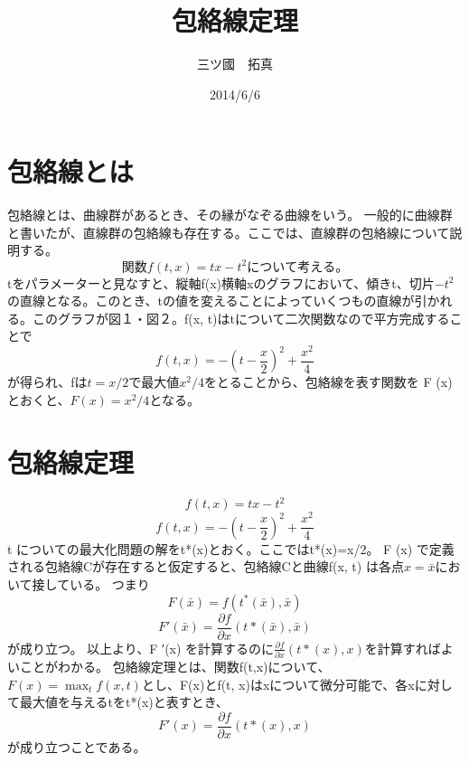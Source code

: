 \documentclass[11pt,a4j,fleqn]{jarticle}
\title{包絡線定理}
\author{三ツ國　拓真}
\date{2014/6/6}
\begin{document}
\maketitle

\section{包絡線とは}

包絡線とは、曲線群があるとき、その縁がなぞる曲線をいう。
一般的に曲線群と書いたが、直線群の包絡線も存在する。ここでは、直線群の包絡線について説明する。
　　　
\[
関数　　f(t, x) = t x - t^2　　　　　　　について考える。
\]
tをパラメーターと見なすと、縦軸f(x)横軸xのグラフにおいて、傾きt、切片$- t^2$の直線となる。このとき、tの値を変えることによっていくつもの直線が引かれる。このグラフが図１・図２。f(x, t)はtについて二次関数なので平方完成することで
\[
f(t, x) = -\left(t - \frac{x}{2}\right)^2 + \frac{x^2}{4} \label{eq:square-2}
\]
が得られ、fは$t=x/2$で最大値$x^2/4$をとることから、包絡線を表す関数を F (x) とおくと、$F (x) =x^2/4$となる。


\section{包絡線定理}

\begin{equation}
f(t, x) = t x - t^2 \label{eq:square}
\end{equation}
\begin{equation}
f(t, x) = -\left(t - \frac{x}{2}\right)^2 + \frac{x^2}{4} \label{eq:square-2}
\end{equation}
 t についての最大化問題の解をt*(x)とおく。ここではt*(x)=x/2。
F (x) で定義される包絡線Cが存在すると仮定すると、包絡線Cと曲線f(x, t) は各点$x = \bar{x}$において接している。
つまり
\begin{equation}
F (\bar{x}) = f(t^* (\bar{x}),\bar{x}) \label{eq:square-2}
\end{equation}
\begin{equation}
F' (\bar{x}) =  \frac{\partial f}{\partial x}(t*(\bar{x}), \bar{x}) \label{eq:square-2} 
\end{equation}
が成り立つ。
以上より、F ′(x) を計算するのに$\frac{\partial f}{\partial x}(t*(x), x)$を計算すればよいことがわかる。
包絡線定理とは、関数f(t,x)について、$F(x) = \max_tf(x, t)$とし、F(x)とf(t, x)はxについて微分可能で、各xに対して最大値を与えるtをt*(x)と表すとき、
\begin{equation}
F'(x) = \frac{\partial f}{\partial x}(t*(x), x) \label{eq:square-2} 
\end{equation}
が成り立つことである。
\end{document}
